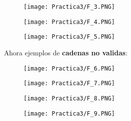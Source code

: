 \documentclass[12pt]{article}
\begin{document}
	\begin{figure}[H]
	        \centering
	        \texttt{[image: Practica3/F\_3.PNG]}
	\end{figure}

	\begin{figure}[H]
	        \centering
	        \texttt{[image: Practica3/F\_4.PNG]}
	\end{figure}

	\begin{figure}[H]
	        \centering
	        \texttt{[image: Practica3/F\_5.PNG]}
	\end{figure}
	\newpage

	Ahora ejemplos de \textbf{cadenas no validas}:
	\begin{figure}[H]
	        \centering
	        \texttt{[image: Practica3/F\_6.PNG]}
	\end{figure}

	\begin{figure}[H]
	        \centering
	        \texttt{[image: Practica3/F\_7.PNG]}
	\end{figure}

	\begin{figure}[H]
	        \centering
	        \texttt{[image: Practica3/F\_8.PNG]}
	\end{figure}

	\begin{figure}[H]
	        \centering
	        \texttt{[image: Practica3/F\_9.PNG]}
	\end{figure}
\end{document}
